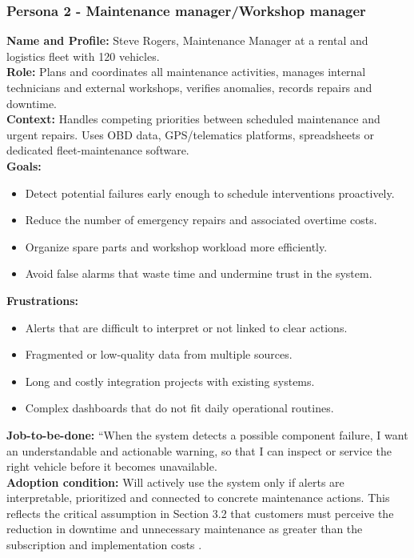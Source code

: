 \documentclass[11pt,a4paper]{article}
\begin{document}
\subsubsection{Persona 2 - Maintenance manager/Workshop manager}
\noindent \textbf{Name and Profile:} Steve Rogers, Maintenance Manager at a rental and logistics fleet with 120 vehicles.
\\ \noindent \textbf{Role:} Plans and coordinates all maintenance activities, manages internal technicians and external workshops, verifies anomalies, records repairs and downtime.
\\ \noindent \textbf{Context:} Handles competing priorities between scheduled maintenance and urgent repairs. Uses OBD data, GPS/telematics platforms, spreadsheets or dedicated fleet-maintenance software.
\vspace{0.5cm}
\\\textbf{Goals:}
\begin{itemize} 
    \item Detect potential failures early enough to schedule interventions proactively.
    \item Reduce the number of emergency repairs and associated overtime costs.
    \item Organize spare parts and workshop workload more efficiently.
    \item Avoid false alarms that waste time and undermine trust in the system.
\end{itemize}
\textbf{Frustrations:}
\begin{itemize}
    \item Alerts that are difficult to interpret or not linked to clear actions.
    \item Fragmented or low-quality data from multiple sources.
    \item Long and costly integration projects with existing systems.
    \item Complex dashboards that do not fit daily operational routines.
\end{itemize}
\vspace{0.5cm}
\noindent \textbf{Job-to-be-done:} “When the system detects a possible component failure, I want an understandable and actionable warning, so that I can inspect or service the right vehicle before it becomes unavailable.\newline
\\
\noindent \textbf{Adoption condition:} Will actively use the system only if alerts are interpretable, prioritized and connected to concrete maintenance actions. This reflects the critical assumption in Section 3.2 that customers must perceive the reduction in downtime and unnecessary maintenance as greater than the subscription and implementation costs .\
\end{document}
